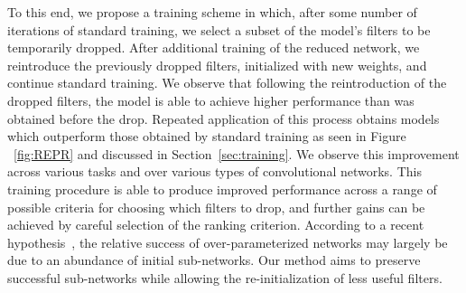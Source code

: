 To this end, we propose a training scheme in which, after some number of iterations of standard training, we select a subset of the model's filters to be temporarily dropped.
After additional training of the reduced network, we reintroduce the previously dropped filters, initialized with new weights, and continue standard training.
We observe that following the reintroduction of the dropped filters, the model is able to achieve higher performance than was obtained before the drop. 
Repeated application of this process obtains models which outperform those obtained by standard training as seen in Figure ~\ref{fig:REPR} and discussed in Section~\ref{sec:training}.
We observe this improvement across various tasks and over various types of convolutional networks.
This training procedure is able to produce improved performance across a range of possible criteria for choosing which filters to drop, and further gains can be achieved by careful selection of the ranking criterion.
According to a recent hypothesis~\cite{Frankle2018TheLT}, the relative success of over-parameterized networks may largely be due to an abundance of initial sub-networks.
Our method aims to preserve successful sub-networks while allowing the re-initialization of less useful filters.


